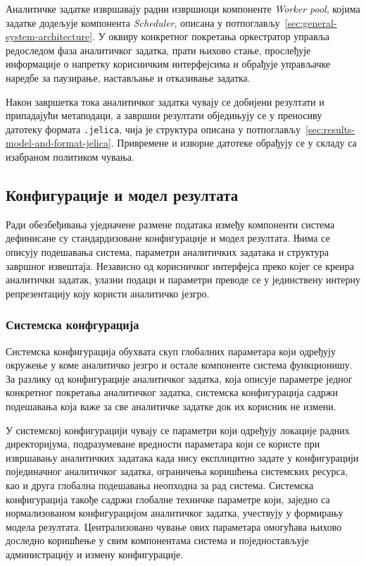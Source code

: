 \documentclass[12pt,oneside]{memoir}
\begin{document}
Аналитичке задатке извршавају радни извршиоци компоненте \textit{Worker pool}, којима задатке додељује компонента \textit{Scheduler}, описана у потпоглављу~\ref{sec:general-system-architecture}. У оквиру конкретног покретања оркестратор управља редоследом фаза аналитичког задатка, прати њихово стање, прослеђује информације о напретку корисничким интерфејсима и обрађује управљачке наредбе за паузирање, настављање и отказивање задатка.

Након завршетка тока аналитичког задатка чувају се добијени резултати и припадајући метаподаци, а завршни резултати обједињују се у преносиву датотеку формата \texttt{.jelica}, чија је структура описана у потпоглављу~\ref{sec:results-model-and-format-jelica}. Привремене и изворне датотеке обрађују се у складу са изабраном политиком чувања.


\subsection{Конфигурације и модел резултата}
\label{sec:configurations-and-result-model}
Ради обезбеђивања уједначене размене података између компоненти система дефинисане су стандардизоване конфигурације и модел резултата. Њима се описују подешавања система, параметри аналитичких задатака и структура завршног извештаја. Независно од корисничког интерфејса преко којег се креира аналитички задатак, улазни подаци и параметри преводе се у јединствену интерну репрезентацију коју користи аналитичко језгро. 


\subsubsection{Системска конфгурација}
Системска конфигурација обухвата скуп глобалних параметара који одређују окружење у коме аналитичко језгро и остале компоненте система функционишу. За разлику од конфигурације аналитичког задатка, која описује параметре једног конкретног покретања аналитичког задатка, системска конфигурација садржи подешавања која важе за све аналитичке задатке док их корисник не измени.

У системској конфигурацији чувају се параметри који одређују локације радних директоријума, подразумеване вредности параметара који се користе при извршавању аналитичких задатака када нису експлицитно задате у конфигурацији појединачног аналитичког задатка, ограничења коришћења системских ресурса, као и друга глобална подешавања неопходна за рад система. Системска конфигурација такође садржи глобалне техничке параметре који, заједно са нормализованом конфигурацијом аналитичког задатка, учествују у формирању модела резултата. Централизовано чување ових параметара омогућава њихово доследно коришћење у свим компонентама система и поједностављује администрацију и измену конфигурације.
\end{document}
